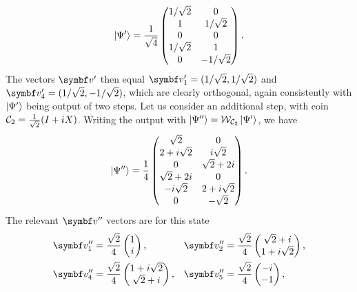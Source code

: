\begin{example}[label=ex:qw_conditions_few_steps]
\begin{equation}
        \ket{\Psi'} =
        \frac{1}{\sqrt4}
        \begin{pmatrix}
            1/\sqrt2 & 0 \\
            1 & 1/\sqrt2 \\ 
            0 & 0 \\
            1/\sqrt2 & 1 \\
            0 & -1/\sqrt2
        \end{pmatrix}.
    \end{equation}
    The vectors $\bs v'$ then equal $\bs v'_1=(1/\sqrt2, 1/\sqrt2)$ and
    $\bs v'_4=(1/\sqrt2, -1/\sqrt2)$,
    which are clearly orthogonal, again consistently with $\ket{\Psi'}$ being output of two steps.
    Let us consider an additional step, with coin ${\mathcal{C}}_2=\frac{1}{\sqrt2}(I + iX)$.
    Writing the output with $\ket{\Psi''}={\mathcal{W}}_{{\mathcal{C}}_2}\ket{\Psi'}$, we have
    \begin{equation}
        \ket{\Psi''} = \frac{1}{4}
        \begin{pmatrix}
            \sqrt2 & 0 \\
            2 + i\sqrt2 & i\sqrt2 \\
            0 & \sqrt2 + 2i \\
            \sqrt2 + 2i & 0 \\
            -i\sqrt2 & 2 + i\sqrt2 \\
            0 & -\sqrt2
        \end{pmatrix}.
    \end{equation}
    The relevant $\bs v''$ vectors are for this state
    \begin{equation}
    \begin{aligned}
        &\bs v''_1 = \frac{\sqrt2}{4}\begin{pmatrix} 1 \\ i \end{pmatrix},
        &&\bs v''_2 = \frac{\sqrt2}{4}\begin{pmatrix} \sqrt2 + i \\ 1 + i\sqrt2 \end{pmatrix}, \\
        &\bs v''_4 = \frac{\sqrt2}{4}\begin{pmatrix} 1 + i\sqrt2\\ \sqrt2 + i \end{pmatrix},
        &&\bs v''_5 = \frac{\sqrt2}{4}\begin{pmatrix} -i \\ -1 \end{pmatrix},

\end{aligned}
\end{equation}
\end{example}
